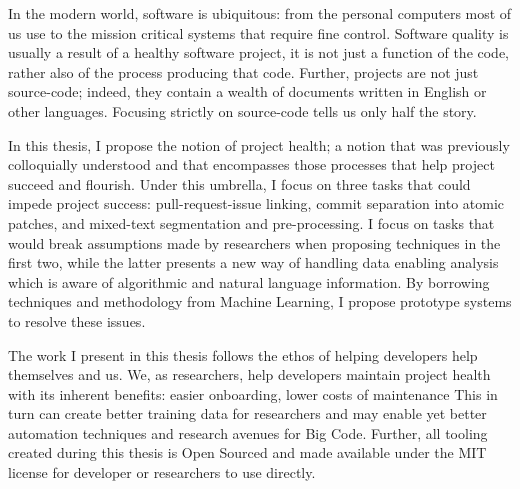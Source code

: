 In the modern world, software is ubiquitous: from the personal computers most of
us use to the mission critical systems that require fine control. Software
quality is usually a result of a healthy software project, \ie it is not just a
function of the code, rather also of the process producing that code.
Further, projects are not just source-code; indeed, they contain a wealth of
documents written in English or other languages. Focusing strictly on
source-code tells us only half the story.

In this thesis, I propose the notion of project health; a notion that was
previously colloquially understood and that encompasses those processes that
help project succeed and flourish. Under this umbrella, I focus on three tasks
that could impede project success: pull-request-issue linking, commit separation
into atomic patches, and mixed-text segmentation and pre-processing. I focus on
tasks that would break assumptions made by researchers when proposing techniques
in the first two, while the latter presents a new way of handling data enabling
analysis which is aware of algorithmic and natural language information. By
borrowing techniques and methodology from Machine Learning, I propose prototype
systems to resolve these issues.

The work I present in this thesis follows the ethos of helping developers help
themselves and us. We, as researchers, help developers maintain project health
with its inherent benefits: easier onboarding, lower costs of maintenance \etc
This in turn can create better training data for researchers and may enable yet
better automation techniques and research avenues for Big Code. Further, all
tooling created during this thesis is Open Sourced and made available under the
MIT license for developer or researchers to use directly.